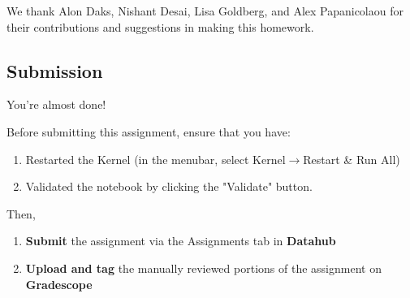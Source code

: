 \documentclass[11pt]{article}
\providecommand{\tightlist}{%
      \setlength{\itemsep}{0pt}\setlength{\parskip}{0pt}}
\begin{document}
We thank Alon Daks, Nishant Desai, Lisa Goldberg, and Alex Papanicolaou
for their contributions and suggestions in making this homework.

    \subsection{Submission}\label{submission}

You're almost done!

Before submitting this assignment, ensure that you have:

\begin{enumerate}
\def\labelenumi{\arabic{enumi}.}
\tightlist
\item
  Restarted the Kernel (in the menubar, select
  Kernel\(\rightarrow\)Restart \& Run All)
\item
  Validated the notebook by clicking the "Validate" button.
\end{enumerate}

Then,

\begin{enumerate}
\def\labelenumi{\arabic{enumi}.}
\tightlist
\item
  \textbf{Submit} the assignment via the Assignments tab in
  \textbf{Datahub}
\item
  \textbf{Upload and tag} the manually reviewed portions of the
  assignment on \textbf{Gradescope}
\end{enumerate}


    
    
    
    
\end{document}
